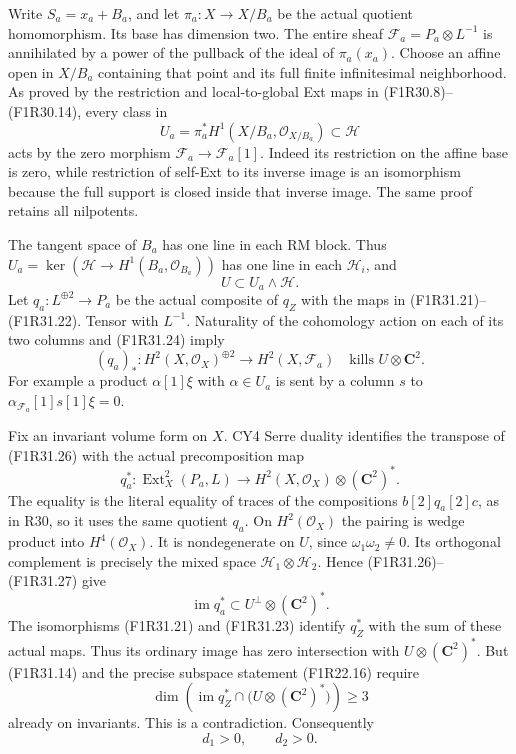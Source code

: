Write $S_a=x_a+B_a$, and let
$\pi_a:X\to X/B_a$ be the actual
quotient homomorphism. Its base has
dimension two. The entire sheaf
$\mathcal F_a=P_a\otimes L^{-1}$ is
annihilated by a power of the pullback
of the ideal of $\pi_a(x_a)$. Choose
an affine open in $X/B_a$ containing
that point and its full finite
infinitesimal neighborhood. As proved
by the restriction and local-to-global
Ext maps in (F1R30.8)--(F1R30.14),
every class in
\[
         U_a=\pi_a^*H^1(X/B_a,\mathcal O_{X/B_a})
                       \subset\mathcal H
 \tag{F1R31.24}
\]
acts by the zero morphism
$\mathcal F_a\to\mathcal F_a[1]$.
Indeed its restriction on the affine
base is zero, while restriction of
self-Ext to its inverse image is an
isomorphism because the full support
is closed inside that inverse image.
The same proof retains all nilpotents.

The tangent space of $B_a$ has one
line in each RM block. Thus
$U_a=\ker(\mathcal H\to H^1(B_a,\mathcal O_{B_a}))$
has one line in each $\mathcal H_i$,
and
\[
                            U\subset U_a\wedge\mathcal H.
 \tag{F1R31.25}
\]
Let $q_a:L^{\oplus2}\to P_a$ be the
actual composite of $q_Z$ with the
maps in (F1R31.21)--(F1R31.22).
Tensor with $L^{-1}$. Naturality of
the cohomology action on each of
its two columns and (F1R31.24) imply
\[
        (q_a)_*:
             H^2(X,\mathcal O_X)^{\oplus2}
                    \longrightarrow H^2(X,\mathcal F_a)
                    \quad\text{kills }U\otimes\mathbf C^2.
 \tag{F1R31.26}
\]
For example a product $\alpha[1]\xi$
with $\alpha\in U_a$ is sent by a
column $s$ to
$\alpha_{\mathcal F_a}[1]s[1]\xi=0$.

Fix an invariant volume form on $X$.
CY4 Serre duality identifies the
transpose of (F1R31.26) with the
actual precomposition map
\[
       q_a^*:\operatorname{Ext}^2_X(P_a,L)
                     \longrightarrow
                     H^2(X,\mathcal O_X)\otimes(\mathbf C^2)^*.
 \tag{F1R31.27}
\]
The equality is the literal equality
of traces of the compositions
$b[2]q_a[2]c$, as in R30, so it
uses the same quotient $q_a$.
On $H^2(\mathcal O_X)$ the pairing
is wedge product into $H^4(\mathcal O_X)$.
It is nondegenerate on $U$, since
$\omega_1\omega_2\ne0$. Its orthogonal
complement is precisely the mixed
space $\mathcal H_1\otimes\mathcal H_2$.
Hence (F1R31.26)--(F1R31.27) give
\[
        \operatorname{im}q_a^*
             \subset U^\perp\otimes(\mathbf C^2)^*.
 \tag{F1R31.28}
\]
The isomorphisms (F1R31.21) and
(F1R31.23) identify $q_Z^*$ with
the sum of these actual maps. Thus
its ordinary image has zero
intersection with
$U\otimes(\mathbf C^2)^*$.
But (F1R31.14) and the precise
subspace statement (F1R22.16) require
\[
 \dim\left(\operatorname{im}q_Z^*
       \cap\bigl(U\otimes(\mathbf C^2)^*\bigr)\right)\ge3
 \tag{F1R31.29}
\]
already on invariants. This is a
contradiction. Consequently
\[
                                 d_1>0,\qquad d_2>0.
 \tag{F1R31.30}
\]

